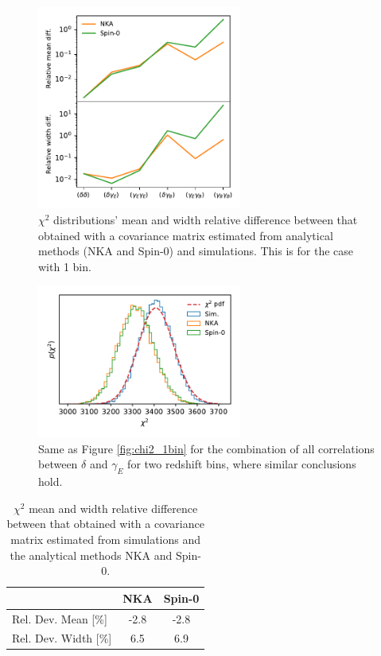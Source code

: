 \documentclass[a4paper,11pt]{article}
\begin{document}
      \begin{figure}
        \centering
        \includegraphics[width=0.6\textwidth]{./figures/run_sph_2b_1stbin_chi2_mean_cov_diff.pdf}
        \caption{$\chi^2$ distributions' mean and width relative difference
          between that obtained with a covariance matrix estimated from
          analytical methods (NKA and Spin-0) and simulations. This is for the
          case with 1 bin.}
        \label{fig:chi2_1bin_diffs}
      \end{figure}
      \begin{figure}
        \centering
        \includegraphics[width=0.6\textwidth]{./figures/run_sph_2b_Spin0_NKA_TTTEEE_Full_chi2.pdf}
        \caption{Same as Figure \ref{fig:chi2_1bin} for the combination of all correlations between $\delta$ and $\gamma_E$ for two redshift bins, where similar conclusions hold.}
        \label{fig:chi2_2bins}
      \end{figure}
      \begin{table}
        \centering
        \begin{tabular}{|l|c|c|}
          \hline
              & NKA & Spin-0 \\
          \hline
          Rel. Dev. Mean [\%]  & -2.8 & -2.8 \\ 
          Rel. Dev. Width [\%] & 6.5  & 6.9  \\
          \hline
        \end{tabular}
        \caption{$\chi^2$ mean and width relative difference between that
          obtained with a covariance matrix estimated from simulations and
          the analytical methods NKA and Spin-0.} 
        \label{tab:chi2_2bins_diffs}
      \end{table}
\end{document}
